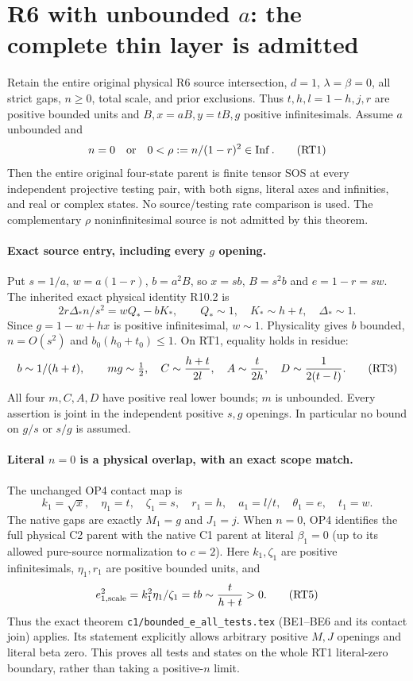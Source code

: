 \section{R6 with unbounded $a$: the complete thin layer is admitted}

\begin{theorem}
Retain the entire original physical R6 source intersection, $d=1$,
$\lambda=\beta=0$, all strict gaps, $n\ge0$, total scale, and prior
exclusions. Thus $t,h,l=1-h,j,r$ are positive bounded units and
$B,x=aB,y=tB,g$ positive infinitesimals. Assume $a$ unbounded and
\[
 n=0\quad\hbox{or}\quad 0<\rho:=n/(1-r)^2\in\operatorname{Inf}.
 \tag{RT1}
\]
Then the entire original four-state parent is finite tensor SOS at
every independent projective testing pair, with both signs, literal
axes and infinities, and real or complex states. No source/testing
rate comparison is used. The complementary $\rho$ noninfinitesimal
source is not admitted by this theorem.
\end{theorem}

\paragraph{Exact source entry, including every $g$ opening.}
Put $s=1/a$, $w=a(1-r)$, $b=a^2B$, so $x=sb$, $B=s^2b$ and
$e=1-r=sw$. The inherited exact physical identity R10.2 is
\[
 2r\Delta_*n/s^2=wQ_*-bK_*,\qquad
 Q_*\sim1,\quad K_*\sim h+t,\quad\Delta_*\sim1.       \tag{RT2}
\]
Since $g=1-w+hx$ is positive infinitesimal, $w\sim1$.
Physicality gives $b$ bounded, $n=O(s^2)$ and
$b_0(h_0+t_0)\le1$. On RT1, equality holds in residue:
\[
 b\sim1/(h+t),\qquad
 m g\sim\tfrac12,\quad C\sim{h+t\over2l},\quad
 A\sim{t\over2h},\quad D\sim{1\over2(t-l)}.          \tag{RT3}
\]
All four $m,C,A,D$ have positive real lower bounds; $m$ is unbounded.
Every assertion is joint in the independent positive $s,g$ openings.
In particular no bound on $g/s$ or $s/g$ is assumed.

\paragraph{Literal $n=0$ is a physical overlap, with an exact scope match.}
The unchanged OP4 contact map is
\[
 k_1=\sqrt{x},\quad\eta_1=t,\quad\zeta_1=s,\quad
 r_1=h,\quad a_1=l/t,\quad\theta_1=e,\quad t_1=w.
 \tag{RT4}
\]
The native gaps are exactly $M_1=g$ and $J_1=j$.
When $n=0$, OP4 identifies the full physical C2 parent with the native
C1 parent at literal $\beta_1=0$ (up to its allowed pure-source
normalization to $c=2$). Here $k_1,\zeta_1$ are positive infinitesimals,
$\eta_1,r_1$ are positive bounded units, and
\[
 e_{1,\mathrm{scale}}^2=k_1^2\eta_1/\zeta_1=tb
              \sim {t\over h+t}>0.                 \tag{RT5}
\]
Thus the exact theorem \texttt{c1/bounded\_e\_all\_tests.tex}
(BE1--BE6 and its contact join) applies. Its statement explicitly
allows arbitrary positive $M,J$ openings and literal beta zero.
This proves all tests and states on the whole RT1 literal-zero
boundary, rather than taking a positive-$n$ limit.

